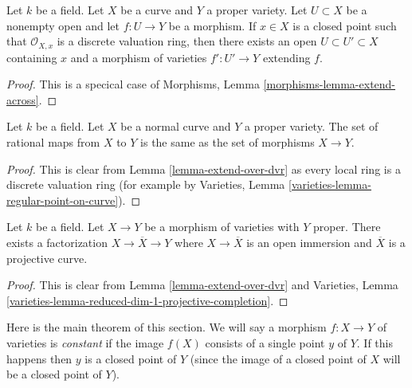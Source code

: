 \begin{lemma}
\label{lemma-extend-over-dvr}
Let $k$ be a field. Let $X$ be a curve and $Y$ a proper variety.
Let $U \subset X$ be a nonempty open and let $f : U \to Y$ be a morphism.
If $x \in X$ is a closed point such that $\mathcal{O}_{X, x}$
is a discrete valuation ring, then there exists an open
$U \subset U' \subset X$ containing $x$ and a morphism of
varieties $f' : U' \to Y$ extending $f$.
\end{lemma}

\begin{proof}
This is a specical case of
Morphisms, Lemma \ref{morphisms-lemma-extend-across}.
\end{proof}

\begin{lemma}
\label{lemma-extend-over-normal-curve}
Let $k$ be a field. Let $X$ be a normal curve and $Y$ a proper variety.
The set of rational maps from $X$ to $Y$ is the same as the set
of morphisms $X \to Y$.
\end{lemma}

\begin{proof}
This is clear from Lemma \ref{lemma-extend-over-dvr}
as every local ring is a discrete valuation ring
(for example by Varieties, Lemma \ref{varieties-lemma-regular-point-on-curve}).
\end{proof}

\begin{lemma}
\label{lemma-extend-to-completion}
Let $k$ be a field. Let $X \to Y$ be a morphism of varieties
with $Y$ proper. There exists a factorization $X \to \overline{X} \to Y$
where $X \to \overline{X}$ is an open immersion
and $\overline{X}$ is a projective curve.
\end{lemma}

\begin{proof}
This is clear from Lemma \ref{lemma-extend-over-dvr}
and Varieties, Lemma \ref{varieties-lemma-reduced-dim-1-projective-completion}.
\end{proof}

\noindent
Here is the main theorem of this section. We will say a morphism
$f : X \to Y$ of varieties is {\it constant} if the image $f(X)$
consists of a single point $y$ of $Y$. If this happens then
$y$ is a closed point of $Y$ (since the image of a closed point
of $X$ will be a closed point of $Y$).

